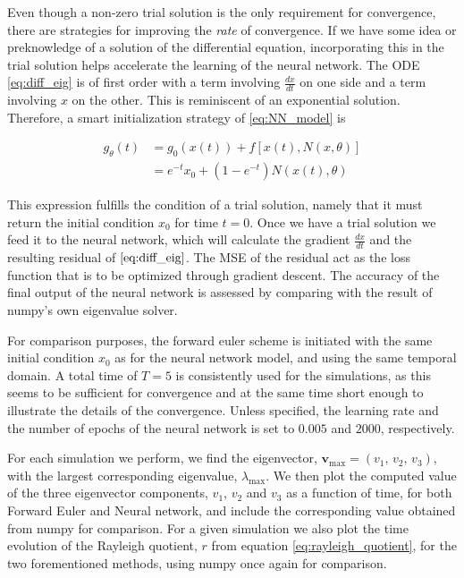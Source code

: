 \documentclass[12pt]{extarticle}
\begin{document}
Even though a non-zero trial solution is the only requirement for convergence, there are strategies for improving the \textit{rate} of convergence. If we have some idea or preknowledge of a solution of the differential equation, incorporating this in the trial solution helps accelerate the learning of the neural network. The ODE \eqref{eq:diff_eig} is of first order with a term involving $\frac{dx}{dt}$ on one side and a term involving $x$ on the other. This is reminiscent of an exponential solution. Therefore, a smart initialization strategy of \eqref{eq:NN_model} is 

\begin{align*}
	g_{\theta}(t) &= g_0(x(t)) + f[x(t),N(x, \theta)] \\
	&= e^{-t}x_0 + (1 - e^{-t})N(x(t), \theta)
\end{align*}

This expression fulfills the condition of a trial solution, namely that it must return the initial condition $x_0$ for time $t=0$. Once we have a trial solution we feed it to the neural network, which will calculate the gradient $\frac{dx}{dt}$ and the resulting residual of $\eqref{eq:diff_eig}$. The MSE of the residual act as the loss function that is to be optimized through gradient descent. The accuracy of the final output of the neural network is assessed by comparing with the result of numpy's own eigenvalue solver. 

For comparison purposes, the forward euler scheme is initiated with the same initial condition $x_0$ as for the neural network model, and using the same temporal domain. A total time of $T=5$ is consistently used for the simulations, as this seems to be sufficient for convergence and at the same time short enough to illustrate the details of the convergence. Unless specified, the learning rate and the number of epochs of the neural network is set to $0.005$ and $2000$, respectively.

For each simulation we perform, we find the eigenvector, $\mathbf{v}_\mathrm{max}=(v_1,\,v_2,\,v_3)$, with the largest corresponding eigenvalue, $\lambda_\mathrm{max}$. We then plot the computed value of the three eigenvector components, $v_1$, $v_2$ and $v_3$ as a function of time, for both Forward Euler and Neural network, and include the corresponding value obtained from numpy for comparison. For a given simulation we also plot the time evolution of the Rayleigh quotient, $r$ from equation \eqref{eq:rayleigh_quotient}, for the two forementioned methods, using numpy once again for comparison.   
\end{document}
